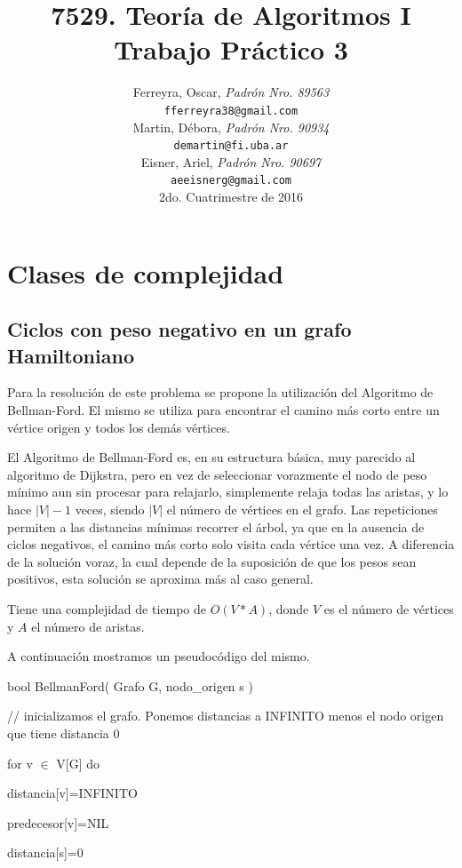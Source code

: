 \documentclass[a4paper,10pt]{article}
\title{
\textbf{ 
	7529. Teoría de Algoritmos I\\
	Trabajo Práctico 3
	}
}
\author{ Ferreyra, Oscar, \textit{Padrón Nro. 89563} \\
\texttt{ fferreyra38@gmail.com } \\[2.5ex]
Martin, Débora, \textit{Padrón Nro. 90934} \\
\texttt{ demartin@fi.uba.ar } \\[2.5ex]
Eisner, Ariel, \textit{Padrón Nro. 90697} \\
\texttt{ aeeisnerg@gmail.com } \\[2.5ex]
\normalsize{2do. Cuatrimestre de 2016} \\
}
\date{}
\begin{document}
\maketitle

\thispagestyle{empty} %
\setcounter{page}{0}
\newpage
\tableofcontents

\newpage

\section{Clases de complejidad}


\subsection{Ciclos con peso negativo en un grafo Hamiltoniano}
Para la resolución de este problema se propone la utilización del Algoritmo de Bellman-Ford. El mismo se utiliza para encontrar el camino más corto entre un vértice origen y todos los demás vértices.

El Algoritmo de Bellman-Ford es, en su estructura básica, muy parecido al algoritmo de Dijkstra, pero en vez de seleccionar vorazmente el nodo de peso mínimo aun sin procesar para relajarlo, simplemente relaja todas las aristas, y lo hace \(|V|-1\) veces, siendo \(|V|\) el número de vértices en el grafo. Las repeticiones permiten a las distancias mínimas recorrer el árbol, ya que en la ausencia de ciclos negativos, el camino más corto solo visita cada vértice una vez. A diferencia de la solución voraz, la cual depende de la suposición de que los pesos sean positivos, esta solución se aproxima más al caso general.

Tiene una complejidad de tiempo de \(O(V*A)\), donde \(V\) es el número de vértices y \(A\) el número de aristas.

A continuación mostramos un pseudocódigo del mismo.

\bigskip

bool BellmanFord( Grafo G, nodo\_origen s )

\quad      // inicializamos el grafo. Ponemos distancias a INFINITO menos el nodo origen que tiene distancia 0

\quad       for v \(\in\) V[G] do
           
\quad \quad           distancia[v]=INFINITO
           
\quad\quad           predecesor[v]=NIL
       
\quad       distancia[s]=0
      
\end{document}
